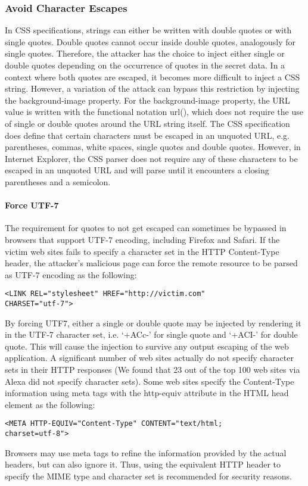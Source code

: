 \documentclass{acm_proc_article-sp}
\begin{document}
{\subsubsection{Avoid Character Escapes}
In CSS specifications\cite{css}, strings can either be written with double quotes or with single quotes. Double quotes cannot occur inside double quotes, analogously for single quotes. Therefore, the attacker has the choice to inject either single or double quotes depending on the occurrence of quotes in the secret data. In a context where both quotes are escaped, it becomes more difficult to inject a CSS string. However, a variation of the attack  can bypass this restriction by injecting the background-image property. For the background-image property, the URL value is written with the functional notation url(), which does not require the use of single or double quotes around the URL string itself. The CSS specification does define that certain characters must be escaped in an unquoted URL, e.g. parentheses, commas, white spaces, single quotes and double quotes. However, in Internet Explorer, the CSS parser does not require any of these characters to be escaped in an unquoted URL and will parse until it encounters a closing parentheses and a semicolon.

\paragraph{Force UTF-7}
The requirement for quotes to not get escaped can sometimes be bypassed in browsers that support UTF-7 encoding, including Firefox and Safari. If the victim web sites fails to specify a character set in the HTTP  Content-Type header, the attacker's malicious page can force the remote resource to be parsed as UTF-7 encoding as the following:
\begin{verbatim}
<LINK REL="stylesheet" HREF="http://victim.com" 
CHARSET="utf-7">
\end{verbatim}
By forcing UTF7, either a single or double quote may be injected by rendering it in the UTF-7 character set, i.e. `+ACc-' for single quote and `+ACI-' for double quote. This will cause the injection to survive any output escaping of the web application. A significant number of web sites actually do not specify character sets in their HTTP responses (We found that 23 out of the top 100 web sites via Alexa\cite{alexa} did not specify character sets). Some web sites specify the Content-Type information using meta tags with the http-equiv attribute in the HTML head element as the following:
\begin{verbatim}
<META HTTP-EQUIV="Content-Type" CONTENT="text/html; 
charset=utf-8">
\end{verbatim}
Browsers may use meta tags to refine the information provided by the actual headers, but can also ignore it. Thus, using the equivalent HTTP header to specify the MIME type and character set is recommended for security reasons.

}
\end{document}
